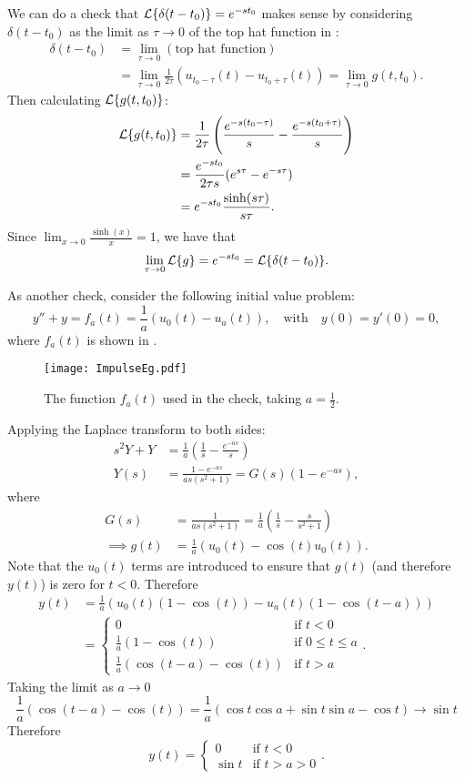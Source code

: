 We can do a check that $\mathcal{L}\{\delta(t-t_0)\} = e^{-st_0}$ makes sense by considering $\delta(t-t_0)$ as the limit as $\tau\to0$ of the top hat function in :
\begin{align*}
	\delta(t-t_0) &= \lim_{\tau\to0} (\text{top hat function}) \\
	&= \lim_{\tau\to0} \frac{1}{2\tau}\left(u_{t_0-\tau}(t) - u_{t_0+\tau}(t)\right) = \lim_{\tau\to0} g(t,t_0).
\end{align*}
Then calculating $\mathcal{L}\{g(t,t_0)\}$:
\begin{align*}
	\mathcal{L}\{g(t,t_0)\} &= \frac{1}{2\tau} \left(\frac{e^{-s(t_0-\tau)}}{s} - \frac{e^{-s(t_0+\tau)}}{s}\right) \\
	&= \frac{e^{-st_0}}{2\tau s} (e^{s\tau}-e^{-s\tau}) \\
	&= e^{-st_0} \frac{\sinh(s\tau)}{s\tau}.
\end{align*}
Since $\lim_{x\to0} \frac{\sinh(x)}{x} = 1$, we have that
\[
\lim_{\tau\to0} \mathcal{L}\{g\} = e^{-st_0} = \mathcal{L}\{\delta(t-t_0)\}.
\]

As another check, consider the following initial value problem:
\[
y''+y = f_a(t) = \frac{1}{a}\left(u_0(t)-u_a(t)\right), \quad\text{with}\quad y(0)=y'(0)=0,
\]
where $f_a(t)$ is shown in .

\begin{figure}[H]
	\centering
	\texttt{[image: ImpulseEg.pdf]}
	\caption{The function $f_a(t)$ used in the check, taking $a=\frac12$.}
	\label{fig:impulseeg}
\end{figure}

Applying the Laplace transform to both sides:
\begin{align*}
	s^2Y + Y &= \frac{1}{a}\left(\frac{1}{s} - \frac{e^{-as}}{s}\right) \\
	Y(s) &= \frac{1-e^{-as}}{as(s^2+1)} = G(s)(1-e^{-as}),
\end{align*}
where
\begin{align*}
	G(s) &= \frac{1}{as(s^2+1)} = \frac{1}{a} \left(\frac{1}{s} - \frac{s}{s^2+1}\right) \\
	\implies g(t) &= \frac{1}{a} \left(u_0(t) - \cos(t)u_0(t)\right).
\end{align*}
Note that the $u_0(t)$ terms are introduced to ensure that $g(t)$ (and therefore $y(t)$) is zero for $t<0$. Therefore
\begin{align*}
	y(t) &= \frac{1}{a} \left(u_0(t)(1-\cos(t)) - u_a(t)(1-\cos(t-a))\right) \\
	&= \begin{cases}0 & \text{if }t<0 \\ \frac{1}{a}(1-\cos(t)) & \text{if } 0 \leq t \leq a \\ \frac{1}{a}(\cos(t-a)-\cos(t)) & \text{if } t>a \end{cases}.
\end{align*}
Taking the limit as $a \to 0$
\[
\frac{1}{a}(\cos(t-a)-\cos(t)) = \frac{1}{a}(\cos{t}\cos{a} + \sin{t}\sin{a} - \cos{t}) \to \sin{t}
\]
Therefore
\[
y(t) = \begin{cases}0 & \text{if } t<0 \\ \sin{t} & \text{if } t>a>0 \end{cases}.
\]

